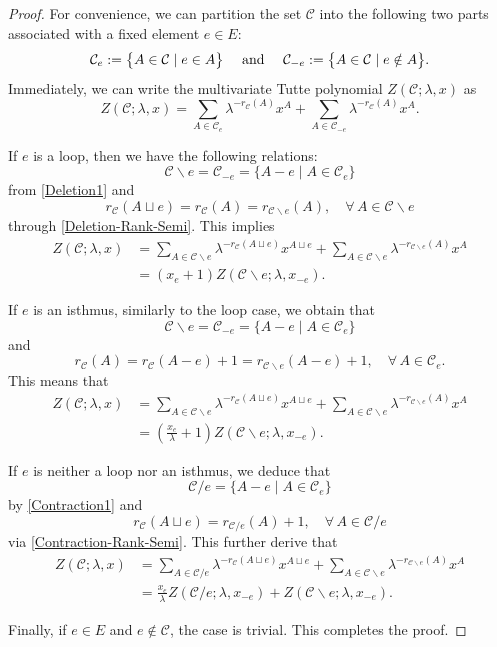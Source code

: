 \documentclass[10pt,a4paper]{amsart}
\def\And{\mbox{\rm ~and~}}
\renewcommand*{\bm}[1]{#1}%
\begin{document}
\begin{proof}
For convenience, we can partition the set $\mathcal{C}$ into the following two parts associated with a fixed element $e\in E$: 
\[
\mathcal{C}_e:=\big\{A\in\mathcal{C}\mid e\in A\big\}\quad\And\quad\mathcal{C}_{-e}:=\big\{A\in\mathcal{C}\mid e\notin A\big\}.
\]
Immediately,  we can write the multivariate Tutte polynomial $Z(\mathcal{C};\lambda,\bm x)$ as
\[
Z(\mathcal{C};\lambda,\bm x)=\sum_{A\in\mathcal{C}_e}\lambda^{-r_\mathcal{C}(A)}\bm x^A+\sum_{A\in\mathcal{C}_{-e}}\lambda^{-r_\mathcal{C}(A)}\bm x^A.
\]

If $e$ is a loop, then we have the following relations:
\[
\mathcal{C}\backslash e=\mathcal{C}_{-e}=\big\{A-e\mid A\in \mathcal{C}_e\big\}
\]
from \eqref{Deletion1} and
\[
r_{\mathcal{C}}(A\sqcup e)=r_{\mathcal{C}}(A)=r_{\mathcal{C}\backslash e}(A),\quad\forall\, A\in \mathcal{C}\backslash e
\]
through \eqref{Deletion-Rank-Semi}. This implies
\begin{align*}
Z(\mathcal{C};\lambda,\bm x)&=\sum_{A\in\mathcal{C}\backslash e}\lambda^{-r_\mathcal{C}(A\sqcup e)}\bm x^{A\sqcup e}+\sum_{A\in\mathcal{C}\backslash e}\lambda^{-r_{\mathcal{C}\backslash e}(A)}\bm x^A\\
&=(x_e+1)Z(\mathcal{C}\backslash e;\lambda,\bm x_{-e}).
\end{align*}

If $e$ is an isthmus, similarly to the loop case, we obtain that
\[
\mathcal{C}\backslash e=\mathcal{C}_{-e}=\big\{A-e\mid A\in \mathcal{C}_e\big\}
\]
and
\[
r_{\mathcal{C}}(A)=r_{\mathcal{C}}(A-e)+1=r_{\mathcal{C}\backslash e}(A-e)+1,\quad\forall\, A\in \mathcal{C}_e.
\]
This means that
\begin{align*}
Z(\mathcal{C};\lambda,\bm x)&=\sum_{A\in\mathcal{C}\backslash e}\lambda^{-r_\mathcal{C}(A\sqcup e)}\bm x^{A\sqcup e}+\sum_{A\in\mathcal{C}\backslash e}\lambda^{-r_{\mathcal{C}\backslash e}(A)}\bm x^A\\
&=(\frac{x_e}{\lambda}+1)Z(\mathcal{C}\backslash e;\lambda,\bm x_{-e}).
\end{align*}

If $e$ is neither a loop nor an isthmus, we deduce that
\[
\mathcal{C}/e=\big\{A-e\mid A\in \mathcal{C}_e\big\}
\]
by \eqref{Contraction1} and
\[
r_{\mathcal{C}}(A\sqcup e)=r_{\mathcal{C}/e}(A)+1,\quad\forall\, A\in \mathcal{C}/e
\]
via \eqref{Contraction-Rank-Semi}. This further derive that 
\begin{align*}
Z(\mathcal{C};\lambda,\bm x)&=\sum_{A\in\mathcal{C}/ e}\lambda^{-r_\mathcal{C}(A\sqcup e)}\bm x^{A\sqcup e}+\sum_{A\in\mathcal{C}\backslash e}\lambda^{-r_{\mathcal{C}\backslash e}(A)}\bm x^A\\
&=\frac{x_e}{\lambda}Z(\mathcal{C}/e;\lambda,\bm x_{-e})+Z(\mathcal{C}\backslash e;\lambda,\bm x_{-e}).
\end{align*}

Finally, if $e\in E$ and $e\notin\mathcal{C}$, the case is trivial. This completes the proof.
\end{proof}
\end{document}
